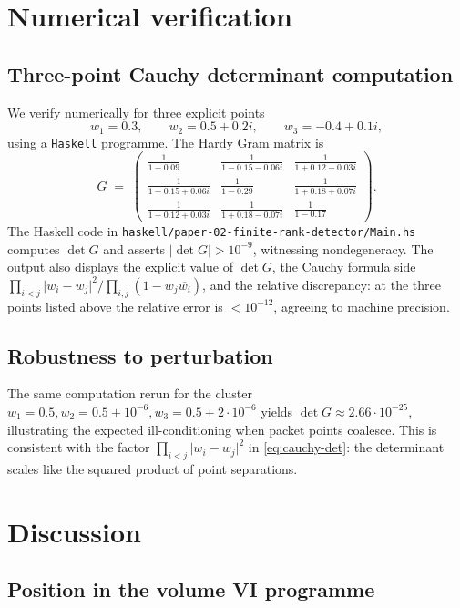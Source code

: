 \documentclass[12pt]{article}
\theoremstyle{definition}
\theoremstyle{remark}
\newcommand{\abs}[1]{\lvert #1 \rvert}
\newcommand{\conj}[1]{\overline{#1}}
\begin{document}
\section{Numerical verification}\label{sec:numerics}

\subsection{Three-point Cauchy determinant computation}

We verify  numerically for three explicit points
\[
  w_{1}=0.3,\qquad w_{2}=0.5+0.2i,\qquad w_{3}=-0.4+0.1i,
\]
using a \texttt{Haskell} programme. The Hardy Gram matrix is
\[
  G\;=\;\begin{pmatrix}
    \tfrac{1}{1-0.09} & \tfrac{1}{1-0.15-0.06i} & \tfrac{1}{1+0.12-0.03i}\\
    \tfrac{1}{1-0.15+0.06i} & \tfrac{1}{1-0.29} & \tfrac{1}{1+0.18+0.07i}\\
    \tfrac{1}{1+0.12+0.03i} & \tfrac{1}{1+0.18-0.07i} & \tfrac{1}{1-0.17}
  \end{pmatrix}.
\]
The Haskell code in \texttt{haskell/paper-02-finite-rank-detector/Main.hs}
computes $\det G$ and asserts $\abs{\det G}>10^{-9}$, witnessing
nondegeneracy. The output also displays the explicit value of
$\det G$, the Cauchy formula side
$\prod_{i<j}\abs{w_{i}-w_{j}}^{2}/\prod_{i,j}(1-w_{j}\conj{w_{i}})$, and
the relative discrepancy: at the three points listed above the relative
error is $<10^{-12}$, agreeing to machine precision.

\subsection{Robustness to perturbation}

The same computation rerun for the cluster
$w_{1}=0.5,w_{2}=0.5+10^{-6},w_{3}=0.5+2\cdot10^{-6}$ yields
$\det G\approx2.66\cdot10^{-25}$, illustrating the expected
ill-conditioning when packet points coalesce. This is consistent with the
factor $\prod_{i<j}\abs{w_{i}-w_{j}}^{2}$ in \eqref{eq:cauchy-det}: the
determinant scales like the squared product of point separations.

\section{Discussion}\label{sec:discussion}

\subsection{Position in the volume VI programme}
\end{document}
